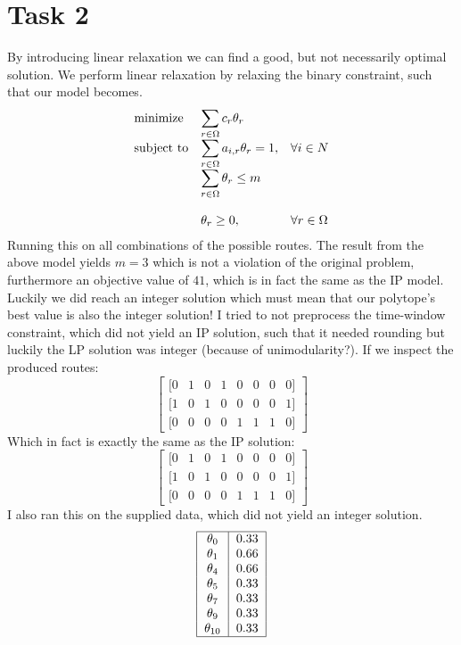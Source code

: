 \documentclass{article}
\begin{document}
    \section{Task 2}
    By introducing linear relaxation we can find a good, but not necessarily optimal solution.
    We perform linear relaxation by relaxing the binary constraint, such that our model becomes.
    \begin{equation*}
        \begin{array}{ll@{}ll}
            \text{minimize}  & \displaystyle\sum_{r \in \Omega} c_r \theta_r& &\\
            \text{subject to}& \displaystyle\sum_{r \in \Omega} a_{i, r} \theta_r = 1 ,&   &\forall i \in N\\
            & \displaystyle\sum_{r \in \Omega} \theta_r \leq m &&\\\\
            & \displaystyle \theta_r  \geq 0,  && \forall r \in \Omega
        \end{array}
    \end{equation*}
    Running this on all combinations of the possible routes.
    The result from the above model yields $m = 3$ which is not a violation of the original problem, furthermore an objective value of $41$, which is in fact the same as the IP model.
    Luckily we did reach an integer solution which must mean that our polytope's best value is also the integer solution!
    I tried to not preprocess the time-window constraint, which did not yield an IP solution, such that it needed rounding but luckily the LP solution was integer (because of unimodularity?).
    If we inspect the produced routes:
    \[
    \begin{bmatrix}
        [0 & 1 & 0 & 1 & 0 & 0 & 0 & 0]\\
        [1 & 0 & 1 & 0 & 0 & 0 & 0 & 1]\\
        [0 & 0 & 0 & 0 & 1 & 1 & 1 & 0]
    \end{bmatrix}
    \]
    Which in fact is exactly the same as the IP solution:
    \[
        \begin{bmatrix}
            [0 & 1 & 0 & 1 & 0 & 0 & 0 & 0]\\
            [1 & 0 & 1 & 0 & 0 & 0 & 0 & 1]\\
            [0 & 0 & 0 & 0 & 1 & 1 & 1 & 0]
        \end{bmatrix}
    \]
    I also ran this on the supplied data, which did not yield an integer solution.
    \[
        \begin{tabular}{ |c|c| }
            \hline
            $\theta_{0}$ & 0.33 \\
            $\theta_{1}$ & 0.66 \\
            $\theta_{4}$ & 0.66 \\
            $\theta_{5}$ & 0.33 \\
            $\theta_{7}$ & 0.33 \\
            $\theta_{9}$ & 0.33 \\
            $\theta_{10}$ & 0.33 \\
            \hline
        \end{tabular}
    \]
\end{document}
